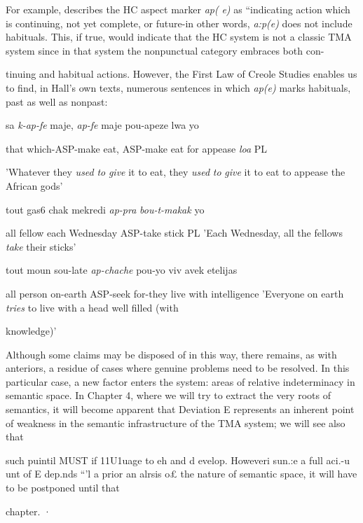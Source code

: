 For example, \citet[31]{Hall1953} describes the HC aspect marker \textit{ap(} \textit{e}\textit{)} as ``indicating action which is continuing, not yet complete, or future{\textquotedbl}{}-in other words, \textit{a:p}\textit{(}\textit{e}\textit{) }does not include habituals. This, if true, would indicate that the HC system is not a classic TMA system since in that system the nonpunctual category embraces both con-


tinuing and habitual actions. However, the First Law of Creole Studies enables us to find, in Hall's own texts, numerous sentences in which \textit{ap(e)} marks habituals, past as well as nonpast:

\ea\label{ex:122}
 sa \textit{k-ap-fe} maje, \textit{ap-fe} maje pou-apeze lwa yo
\glt
\z

that which-ASP-make eat, ASP-make eat for appease \textit{loa} PL

'Whatever they \textit{used} \textit{to} \textit{give} it to eat, they \textit{used} \textit{to} \textit{give} it to eat to appease the African gods'

\ea\label{ex:123}
 tout gas6 chak mekredi \textit{ap-pra} \textit{bou-t-makak} yo
\glt
\z

all fellow each Wednesday ASP-take stick PL 'Each Wednesday, all the fellows \textit{take} their sticks'

\ea\label{ex:124}
 tout moun sou-late \textit{ap-chache} pou-yo viv avek etelijas
\glt
\z

all person on-earth ASP-seek for-they live with intelligence 'Everyone on earth \textit{tries }to live with a head well filled (with

knowledge)'

Although some claims may be disposed of in this way, there remains, as with anteriors, a residue of cases where genuine problems need to be resolved. In this particular case, a new factor enters the system: areas of relative indeterminacy in semantic space. In Chapter 4, where we will try to extract the very roots of semantics, it will become apparent that Deviation E represents an inherent point of weakness in the semantic infrastructure of the TMA system; we will see also that

such puintil MUST if 11U1uage to eh and d evelop. Howeveri sun.:e a full aci.-u unt of E dep.nds ``'l a prior an alrsis o£ the nature of semantic space, it will have to be postponed until that

chapter. ·

